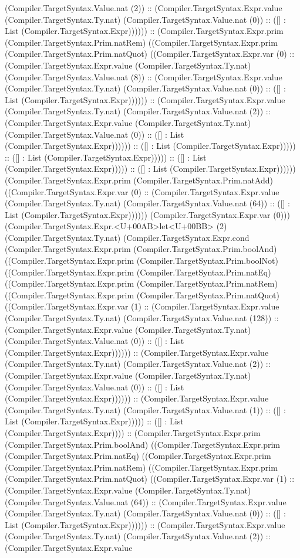 \documentclass[11pt]{article}
\begin{document}
(Compiler.TargetSyntax.Value.nat (2)) :: (Compiler.TargetSyntax.Expr.value (Compiler.TargetSyntax.Ty.nat) (Compiler.TargetSyntax.Value.nat (0)) :: ([] : List (Compiler.TargetSyntax.Expr)))))) :: (Compiler.TargetSyntax.Expr.prim (Compiler.TargetSyntax.Prim.natRem) ((Compiler.TargetSyntax.Expr.prim (Compiler.TargetSyntax.Prim.natQuot) ((Compiler.TargetSyntax.Expr.var (0) :: (Compiler.TargetSyntax.Expr.value (Compiler.TargetSyntax.Ty.nat) (Compiler.TargetSyntax.Value.nat (8)) :: (Compiler.TargetSyntax.Expr.value (Compiler.TargetSyntax.Ty.nat) (Compiler.TargetSyntax.Value.nat (0)) :: ([] : List (Compiler.TargetSyntax.Expr)))))) :: (Compiler.TargetSyntax.Expr.value (Compiler.TargetSyntax.Ty.nat) (Compiler.TargetSyntax.Value.nat (2)) :: (Compiler.TargetSyntax.Expr.value (Compiler.TargetSyntax.Ty.nat) (Compiler.TargetSyntax.Value.nat (0)) :: ([] : List (Compiler.TargetSyntax.Expr)))))) :: ([] : List (Compiler.TargetSyntax.Expr))))) :: ([] : List (Compiler.TargetSyntax.Expr))))) :: ([] : List (Compiler.TargetSyntax.Expr))))) :: ([] : List (Compiler.TargetSyntax.Expr)))))) (Compiler.TargetSyntax.Expr.prim (Compiler.TargetSyntax.Prim.natAdd) ((Compiler.TargetSyntax.Expr.var (0) :: (Compiler.TargetSyntax.Expr.value (Compiler.TargetSyntax.Ty.nat) (Compiler.TargetSyntax.Value.nat (64)) :: ([] : List (Compiler.TargetSyntax.Expr)))))) (Compiler.TargetSyntax.Expr.var (0))) (Compiler.TargetSyntax.Expr.<U+00AB>let<U+00BB> (2) (Compiler.TargetSyntax.Ty.nat) (Compiler.TargetSyntax.Expr.cond (Compiler.TargetSyntax.Expr.prim (Compiler.TargetSyntax.Prim.boolAnd) ((Compiler.TargetSyntax.Expr.prim (Compiler.TargetSyntax.Prim.boolNot) ((Compiler.TargetSyntax.Expr.prim (Compiler.TargetSyntax.Prim.natEq) ((Compiler.TargetSyntax.Expr.prim (Compiler.TargetSyntax.Prim.natRem) ((Compiler.TargetSyntax.Expr.prim (Compiler.TargetSyntax.Prim.natQuot) ((Compiler.TargetSyntax.Expr.var (1) :: (Compiler.TargetSyntax.Expr.value (Compiler.TargetSyntax.Ty.nat) (Compiler.TargetSyntax.Value.nat (128)) :: (Compiler.TargetSyntax.Expr.value (Compiler.TargetSyntax.Ty.nat) (Compiler.TargetSyntax.Value.nat (0)) :: ([] : List (Compiler.TargetSyntax.Expr)))))) :: (Compiler.TargetSyntax.Expr.value (Compiler.TargetSyntax.Ty.nat) (Compiler.TargetSyntax.Value.nat (2)) :: (Compiler.TargetSyntax.Expr.value (Compiler.TargetSyntax.Ty.nat) (Compiler.TargetSyntax.Value.nat (0)) :: ([] : List (Compiler.TargetSyntax.Expr)))))) :: (Compiler.TargetSyntax.Expr.value (Compiler.TargetSyntax.Ty.nat) (Compiler.TargetSyntax.Value.nat (1)) :: ([] : List (Compiler.TargetSyntax.Expr))))) :: ([] : List (Compiler.TargetSyntax.Expr)))) :: (Compiler.TargetSyntax.Expr.prim (Compiler.TargetSyntax.Prim.boolAnd) ((Compiler.TargetSyntax.Expr.prim (Compiler.TargetSyntax.Prim.natEq) ((Compiler.TargetSyntax.Expr.prim (Compiler.TargetSyntax.Prim.natRem) ((Compiler.TargetSyntax.Expr.prim (Compiler.TargetSyntax.Prim.natQuot) ((Compiler.TargetSyntax.Expr.var (1) :: (Compiler.TargetSyntax.Expr.value (Compiler.TargetSyntax.Ty.nat) (Compiler.TargetSyntax.Value.nat (64)) :: (Compiler.TargetSyntax.Expr.value (Compiler.TargetSyntax.Ty.nat) (Compiler.TargetSyntax.Value.nat (0)) :: ([] : List (Compiler.TargetSyntax.Expr)))))) :: (Compiler.TargetSyntax.Expr.value (Compiler.TargetSyntax.Ty.nat) (Compiler.TargetSyntax.Value.nat (2)) :: (Compiler.TargetSyntax.Expr.value 
\end{document}
